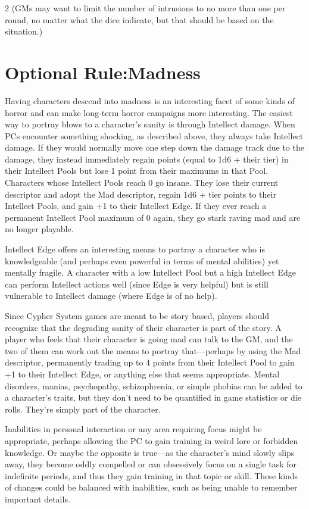 \begin{multicols}{2}
(GMs may want to limit the number of intrusions to no more than one per round, no matter what the dice indicate, but that should be based on the situation.)

\chapter{Optional Rule:Madness}

Having characters descend into madness is an interesting facet of some kinds of horror and can make long-term horror campaigns more interesting. The easiest way to portray blows to a character’s sanity is through Intellect damage. When PCs encounter something shocking, as described above, they always take Intellect damage. If they would normally move one step down the damage track due to the damage, they instead immediately regain points (equal to 1d6 + their tier) in their Intellect Pools but lose 1 point from their maximums in that Pool. Characters whose Intellect Pools reach 0 go insane. They lose their current descriptor and adopt the Mad descriptor, regain 1d6 + tier points to their Intellect Pools, and gain +1 to their Intellect Edge. If they ever reach a permanent Intellect Pool maximum of 0 again, they go stark raving mad and are no longer playable.

Intellect Edge offers an interesting means to portray a character who is knowledgeable (and perhaps even powerful in terms of mental abilities) yet mentally fragile. A character with a low Intellect Pool but a high Intellect Edge can perform Intellect actions well (since Edge is very helpful) but is still vulnerable to Intellect damage (where Edge is of no help).

Since Cypher System games are meant to be story based, players should recognize that the degrading sanity of their character is part of the story. A player who feels that their character is going mad can talk to the GM, and the two of them can work out the means to portray that—perhaps by using the Mad descriptor, permanently trading up to 4 points from their Intellect Pool to gain +1 to their Intellect Edge, or anything else that seems appropriate. Mental disorders, manias, psychopathy, schizophrenia, or simple phobias can be added to a character’s traits, but they don’t need to be quantified in game statistics or die rolls. They’re simply part of the character.

Inabilities in personal interaction or any area requiring focus might be appropriate, perhaps allowing the PC to gain training in weird lore or forbidden knowledge. Or maybe the opposite is true—as the character’s mind slowly slips away, they become oddly compelled or can obsessively focus on a single task for indefinite periods, and thus they gain training in that topic or skill. These kinds of changes could be balanced with inabilities, such as being unable to remember important details.


\end{multicols}
